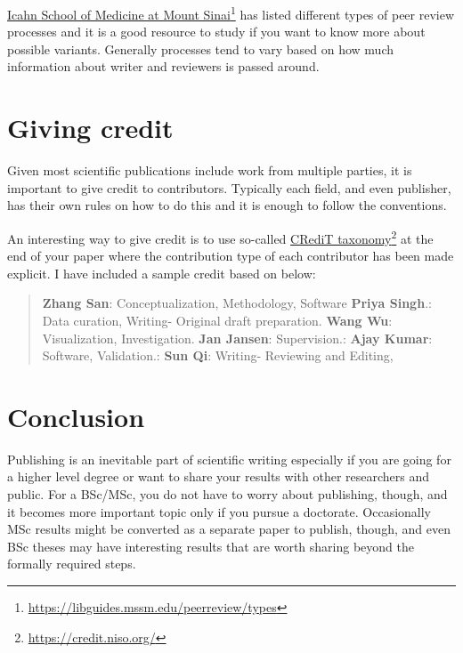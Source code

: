 \href{https://libguides.mssm.edu/peerreview/types}{Icahn School of Medicine at Mount Sinai}\footnote{\url{https://libguides.mssm.edu/peerreview/types}} has listed different types of peer review processes and it is a good resource to study if you want to know more about possible variants.
Generally processes tend to vary based on how much information about writer and reviewers is passed around.

\section{Giving credit}

Given most scientific publications include work from multiple parties, it is important to give credit to contributors.
Typically each field, and even publisher, has their own rules on how to do this and it is enough to follow the conventions.

An interesting way to give credit is to use so-called \href{https://credit.niso.org/}{CRediT taxonomy}\footnote{\url{https://credit.niso.org/}} at the end of your paper where the contribution type of each contributor has been made explicit. I have included a sample credit based on \citet{elsevierCRediTAuthor} below:

\begin{quote}
\textbf{Zhang San}: Conceptualization, Methodology, Software \textbf{Priya Singh}.: Data curation, Writing- Original draft preparation. \textbf{Wang Wu}: Visualization, Investigation. \textbf{Jan Jansen}: Supervision.: \textbf{Ajay Kumar}: Software, Validation.: \textbf{Sun Qi}: Writing- Reviewing and Editing,
\end{quote}

\section{Conclusion}

Publishing is an inevitable part of scientific writing especially if you are going for a higher level degree or want to share your results with other researchers and public.
For a BSc/MSc, you do not have to worry about publishing, though, and it becomes more important topic only if you pursue a doctorate.
Occasionally MSc results might be converted as a separate paper to publish, though, and even BSc theses may have interesting results that are worth sharing beyond the formally required steps.
